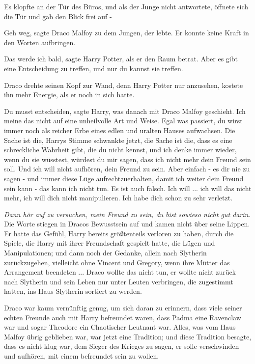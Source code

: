 Es klopfte an der Tür des Büros, und als der Junge nicht antwortete, öffnete
sich die Tür und gab den Blick frei auf -

\glqq{}Geh weg\grqq{}, sagte Draco Malfoy zu dem Jungen, der lebte. Er konnte
keine Kraft in den Worten aufbringen.

\glqq{}Das werde ich bald\grqq{}, sagte Harry Potter, als er den Raum betrat.
\glqq{}Aber es gibt eine Entscheidung zu treffen, und nur du kannst sie
treffen.\grqq{}

Draco drehte seinen Kopf zur Wand, denn Harry Potter nur anzusehen, kostete ihn
mehr Energie, als er noch in sich hatte.

\glqq{}Du musst entscheiden\grqq{}, sagte Harry, \glqq{}was danach mit Draco
Malfoy geschieht. Ich meine das nicht auf eine unheilvolle Art und Weise. Egal
was passiert, du wirst immer noch als reicher Erbe eines edlen und uralten
Hauses aufwachsen. Die Sache ist die\grqq{}, Harrys Stimme schwankte jetzt,
\glqq{}die Sache ist die, dass es eine schreckliche Wahrheit gibt, die du nicht
kennst, und ich denke immer wieder, wenn du sie wüsstest, würdest du mir sagen,
dass ich nicht mehr dein Freund sein soll. Und ich will nicht aufhören, dein
Freund zu sein. Aber einfach - es dir nie zu sagen - und immer diese Lüge
aufrechtzuerhalten, damit ich weiter dein Freund sein kann - das kann ich nicht
tun. Es ist auch falsch. Ich will ... ich will das nicht mehr, ich will dich
nicht manipulieren. Ich habe dich schon zu sehr verletzt.\grqq{}

\emph{Dann hör auf zu versuchen, mein Freund zu sein, du bist sowieso nicht gut
darin.} Die Worte stiegen in Dracos Bewusstsein auf und kamen nicht über seine
Lippen. Er hatte das Gefühl, Harry bereits größtenteils verloren zu haben, durch
die Spiele, die Harry mit ihrer Freundschaft gespielt hatte, die Lügen und
Manipulationen; und dann noch der Gedanke, allein nach Slytherin zurückzugehen,
vielleicht ohne Vincent und Gregory, wenn ihre Mütter das Arrangement
beendeten ... Draco wollte das nicht tun, er wollte nicht zurück nach Slytherin
und sein Leben nur unter Leuten verbringen, die zugestimmt hatten, ins Haus
Slytherin sortiert zu werden.

Draco war kaum vernünftig genug, um sich daran zu erinnern, dass viele seiner
echten Freunde auch mit Harry befreundet waren, dass Padma eine Ravenclaw war
und sogar Theodore ein Chaotischer Leutnant war. Alles, was vom Haus Malfoy
übrig geblieben war, war jetzt eine Tradition; und diese Tradition besagte, dass
es nicht klug war, dem Sieger des Krieges zu sagen, er solle verschwinden und
aufhören, mit einem befreundet sein zu wollen.

